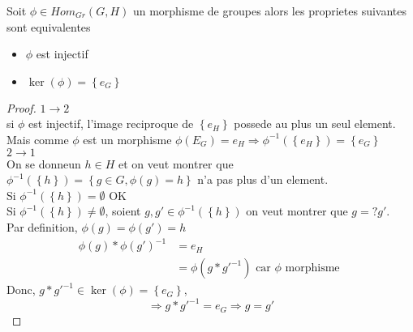 \documentclass[../main.tex]{subfiles}
\begin{document}
\begin{thm}\label{thm:critere_d_injectivite}
	Soit $\phi \in Hom_{Gr} ( G,H)$ un morphisme de groupes alors les proprietes suivantes sont equivalentes
	\begin{itemize}
	\item $\phi$ est injectif
	\item $\ker(\phi) = \left\{ e_G \right\} $
	\end{itemize}
	
\end{thm}
\begin{proof}
	$1 \rightarrow 2$\\
	si $\phi $ est injectif, l'image reciproque de $ \left\{ e_H \right\} $ possede au plus un seul element. Mais comme $\phi$ est un morphisme $\phi(E_G) = e_H \Rightarrow \phi^{-1}( \left\{ e_H \right\} ) = \left\{ e_G \right\} $\\
	$2 \rightarrow 1$\\
	On se donneun $h \in H$ et on veut montrer que $\phi^{-1}( \left\{ h \right\} ) = \left\{ g \in G, \phi(g) =h \right\} $ n'a pas plus d'un element.\\
	Si $\phi^{-1}( \left\{ h \right\} ) = \emptyset $ OK\\
	Si $\phi^{-1}( \left\{ h \right\} ) \neq \emptyset$, soient $g,g' \in \phi^{-1}( \left\{ h \right\} )$ on veut montrer que $g=?g'$.\\
	Par definition,  $\phi(g) = \phi(g') = h$ 
	\begin{align*}
		\phi(g) \ast \phi(g')^{-1} &= e_H\\
				      &= \phi(g \ast g'^{-1}) \text{ car $\phi$ morphisme } 
	\end{align*}
	Donc, $g \ast g'^{-1} \in \ker(\phi) = \left\{ e_G \right\} $,
	\[ 
	\Rightarrow  g \ast g'^{-1} = e_G \Rightarrow g = g'
	\]
	
	
\end{proof}
\end{document}
